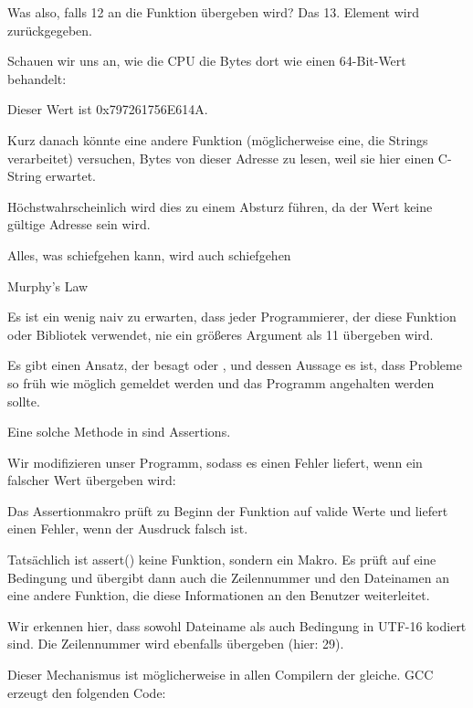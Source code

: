 Was also, falls 12 an die Funktion übergeben wird? Das 13. Element wird zurückgegeben.

Schauen wir uns an, wie die CPU die Bytes dort wie einen 64-Bit-Wert behandelt:



Dieser Wert ist 0x797261756E614A.

Kurz danach könnte eine andere Funktion (möglicherweise eine, die Strings verarbeitet) versuchen, Bytes von dieser
Adresse zu lesen, weil sie hier einen C-String erwartet.

Höchstwahrscheinlich wird dies zu einem Absturz führen, da der Wert keine gültige Adresse sein wird.


\epigraph{Alles, was schiefgehen kann, wird auch schiefgehen}{Murphy's Law}
Es ist ein wenig naiv zu erwarten, dass jeder Programmierer, der diese Funktion oder Bibliotek verwendet, nie ein
größeres Argument als 11 übergeben wird.

Es gibt einen Ansatz, der besagt  oder , und dessen Aussage es ist, dass
Probleme so früh wie möglich gemeldet werden und das Programm angehalten werden sollte.

Eine solche Methode in \CCpp sind Assertions.

Wir modifizieren unser Programm, sodass es einen Fehler liefert, wenn ein falscher Wert übergeben wird:



Das Assertionmakro prüft zu Beginn der Funktion auf valide Werte und liefert einen Fehler, wenn der Ausdruck falsch ist.


Tatsächlich ist assert() keine Funktion, sondern ein Makro. Es prüft auf eine Bedingung und übergibt dann auch die
Zeilennummer und den Dateinamen an eine andere Funktion, die diese Informationen an den Benutzer weiterleitet.

Wir erkennen hier, dass sowohl Dateiname als auch Bedingung in UTF-16 kodiert sind.
Die Zeilennummer wird ebenfalls übergeben (hier: 29).

Dieser Mechanismus ist möglicherweise in allen Compilern der gleiche. 
GCC erzeugt den folgenden Code:

